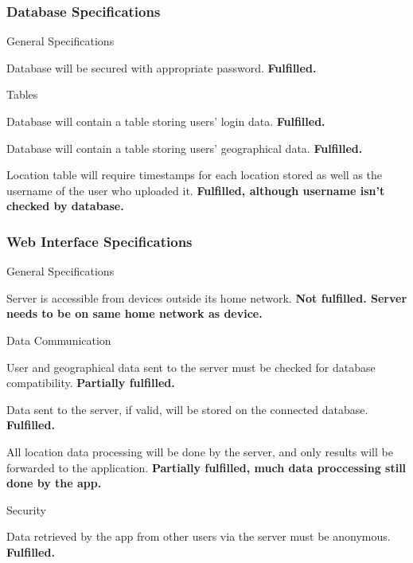 \subsubsection{Database Specifications}

\begin{SA}
    \item General Specifications
    \begin{SA}
        \item Database will be secured with appropriate password. \textbf{Fulfilled.}
    \end{SA}
    \item Tables
    \begin{SA}
        \item Database will contain a table storing users' login data. \textbf{Fulfilled.}
        \item Database will contain a table storing users' geographical data. \textbf{Fulfilled.}
        \item Location table will require timestamps for each location stored as well as the username of the user who uploaded it. \textbf{Fulfilled, although username isn't checked by database.}
    \end{SA}
\end{SA}

\subsubsection{Web Interface Specifications}

\begin{SA}
    \item General Specifications
    \begin{SA}
        \item Server is accessible from devices outside its home network. \textbf{Not fulfilled. Server needs to be on same home network as device.}
    \end{SA}
    \item Data Communication
    \begin{SA}
        \item User and geographical data sent to the server must be checked for database compatibility. \textbf{Partially fulfilled.}
        \item Data sent to the server, if valid, will be stored on the connected database. \textbf{Fulfilled.}
        \item All location data processing will be done by the server, and only results will be forwarded to the application. \textbf{Partially fulfilled, much data proccessing still done by the app.}
    \end{SA}
    \item Security
    \begin{SA}
        \item Data retrieved by the app from other users via the server must be anonymous. \textbf{Fulfilled.}
    \end{SA}
\end{SA}

